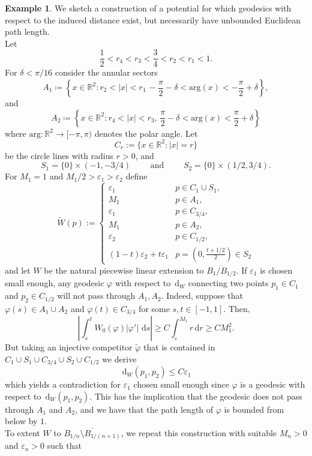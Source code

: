 \documentclass[a4paper, 11pt, reqno]{amsart}
\theoremstyle{plain}
\theoremstyle{definition}
\newtheorem{example}[theorem]{Example}
\theoremstyle{remark}
\newcommand{\R}{\mathbb R}
\newcommand{\eps}{\varepsilon}
\newcommand{\dd}{\,\mathrm{d}}
\renewcommand{\arg}{\mathrm{arg}}
\begin{document}
\begin{example}\label{ex:geodesics_infinite_Euclidean_length}
We sketch a construction of a potential for which geodesics with respect to the induced distance exist, but necessarily have unbounded Euclidean path length. \\
Let 
$$ \frac{1}{2} < r_4 < r_3  < \frac{3}{4} < r_2 < r_1 < 1.$$
For $\delta < \pi/16$ consider the annular sectors
\[
    A_1 \coloneqq \left\{ x \in \R^2 : r_2 < |x| < r_1 \, -\frac{\pi}{2} - \delta < \arg(x) < -\frac{\pi}{2} + \delta \right\},
\]
and
\[
    A_2 \coloneqq \left\{ x \in \R^2 : r_4 < |x| < r_3, \, \frac{\pi}{2} - \delta < \arg(x) < \frac{\pi}{2} + \delta \right\}
\]
where $\arg: \R^2 \to [-\pi, \pi)$ denotes the polar angle.
Let 
\[
    C_r := \{ x \in \R^2 : |x| = r \}
\]
be the circle lines with radius $r > 0$, and 
\[
    S_1 = \{0\}\times(-1, -3/4) \qquad \text{ and } \qquad S_2 = \{0\} \times (1/2, 3/4).
\]
For $M_1 = 1$ and $M_1/2 > \eps_1 > \eps_2$ define
\[
    \tilde W(p) := \begin{cases}
        \eps_1 & p \in C_1 \cup S_1, \\
        M_1 & p \in A_1, \\
        \eps_1 & p \in C_{3/4}, \\
        M_1 & p \in A_2, \\
        \eps_2 & p \in C_{1/2}, \\
        (1-t) \eps_2 + t \eps_1 & p = \left(0, \frac{t+1/2}{2}\right) \in S_2
    \end{cases}
\]
and let $W$ be the natural piecewise linear extension to $\overline{B_1/B_{1/2}}$. If $\eps_1$ is chosen small enough, any geodesic $\varphi$ with respect to $\dd_W$ connecting two points $p_1 \in C_1$ and $p_2 \in C_{1/2}$ will not pass through $A_1, A_2$. Indeed, suppose that $\varphi(s) \in A_1 \cup A_2$ and $\varphi(t) \in C_{3/4}$ for some $s,t \in [-1,1]$. Then,
\[
    \left| \int_{s}^t W_0(\varphi)|\varphi'| \, \dd s \right| \geq C \int_{\eps}^{M_1} r \dd r \geq CM_1^2.
\]
But taking an injective competitor $\tilde \varphi$ that is contained in $C_1 \cup S_1 \cup C_{3/4} \cup S_2 \cup C_{1/2}$ we derive 
\[
    \dd_{W}(p_1, p_2) \leq C\eps_1
\]
which yields a contradiction for $\eps_1 $ chosen small enough since $\varphi$ is a geodesic with respect to $\dd_{W}(p_1, p_2)$. This has the implication that the geodesic does not pass through $A_1$ and $A_2$, and we have that the path length of $\varphi$ is bounded from below by $1$.  \\
To extent $W$ to $\overline{B_{1/n}\setminus B_{1/(n+1)}}$, we repeat this construction with suitable $M_n > 0$ and $\eps_n > 0$ such that

\end{example}
\end{document}
